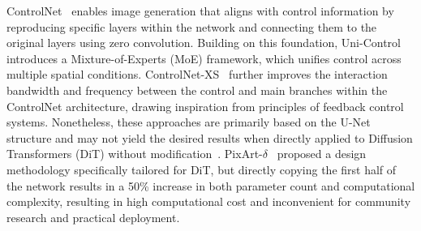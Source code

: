 ControlNet~\cite{zhang2023controlnet} enables image generation that aligns with control information by reproducing specific layers within the network and connecting them to the original layers using zero convolution. Building on this foundation, Uni-Control~\cite{qin2023unicontrol} introduces a Mixture-of-Experts (MoE) framework, which unifies control across multiple spatial conditions. ControlNet-XS~\cite{zavadski2025controlnetxs} further improves the interaction bandwidth and frequency between the control and main branches within the ControlNet architecture, drawing inspiration from principles of feedback control systems. Nonetheless, these approaches are primarily based on the U-Net structure and may not yield the desired results when directly applied to Diffusion Transformers (DiT) without modification~\cite{chen2024PixArtc}. PixArt-$\delta$~\cite{chen2024PixArtc} proposed a design methodology specifically tailored for DiT, but directly copying the first half of the network results in a 50\% increase in both parameter count and computational complexity, resulting in high computational cost and inconvenient for community research and practical deployment.